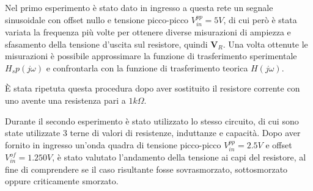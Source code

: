     Nel primo esperimento è stato dato in ingresso a questa rete un segnale sinusoidale con offset nullo e 
    tensione picco-picco $V^{pp}_{in} = 5V$, di cui però è stata variata la frequenza più volte per ottenere diverse misurazioni
    di ampiezza e sfasamento della tensione d'uscita sul resistore, quindi $\mathbf{V}_R$.
    Una volta ottenute le misurazioni è possibile approssimare la funzione di trasferimento sperimentale $H_sp(j\omega)$
    e confrontarla con la funzione di trasferimento teorica $H(j\omega)$.\par
    È stata ripetuta questa procedura dopo aver sostituito il resistore corrente con uno avente una resistenza
    pari a $1k\Omega$. \par
    Durante il secondo esperimento è stato utilizzato lo stesso circuito, di cui sono state utilizzate 3 terne di valori di
    resistenze, induttanze e capacità. Dopo aver fornito in ingresso un'onda quadra di tensione picco-picco $V^{pp}_{in} = 2.5 V$
    e offset $V^{of}_{in} = 1.250 V$, è stato valutato l'andamento della tensione ai capi del resistore, al fine 
    di comprendere se il caso risultante fosse sovrasmorzato, sottosmorzato oppure criticamente smorzato. \par

    
